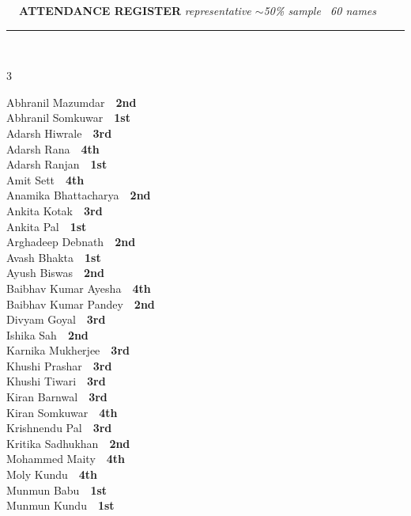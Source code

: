 \documentclass[11pt,a4paper]{article}
\begin{document}
\vspace{3pt}\noindent
{\footnotesize\bfseries\color{Slate}\faListOl~~ATTENDANCE REGISTER}%
\hfill{\scriptsize\itshape\color{Slate}representative $\sim$50\% sample \textperiodcentered\ 60 names}\\[3pt]
{\color{Line}\rule{\linewidth}{0.5pt}}\\[5pt]
\begingroup\footnotesize\setlength{\columnsep}{20pt}\setlength{\parskip}{1pt}%
\begin{multicols}{3}\raggedright
Abhranil Mazumdar~\dotfill~\textbf{2nd}\\
Abhranil Somkuwar~\dotfill~\textbf{1st}\\
Adarsh Hiwrale~\dotfill~\textbf{3rd}\\
Adarsh Rana~\dotfill~\textbf{4th}\\
Adarsh Ranjan~\dotfill~\textbf{1st}\\
Amit Sett~\dotfill~\textbf{4th}\\
Anamika Bhattacharya~\dotfill~\textbf{2nd}\\
Ankita Kotak~\dotfill~\textbf{3rd}\\
Ankita Pal~\dotfill~\textbf{1st}\\
Arghadeep Debnath~\dotfill~\textbf{2nd}\\
Avash Bhakta~\dotfill~\textbf{1st}\\
Ayush Biswas~\dotfill~\textbf{2nd}\\
Baibhav Kumar Ayesha~\dotfill~\textbf{4th}\\
Baibhav Kumar Pandey~\dotfill~\textbf{2nd}\\
Divyam Goyal~\dotfill~\textbf{3rd}\\
Ishika Sah~\dotfill~\textbf{2nd}\\
Karnika Mukherjee~\dotfill~\textbf{3rd}\\
Khushi Prashar~\dotfill~\textbf{3rd}\\
Khushi Tiwari~\dotfill~\textbf{3rd}\\
Kiran Barnwal~\dotfill~\textbf{3rd}\\
Kiran Somkuwar~\dotfill~\textbf{4th}\\
Krishnendu Pal~\dotfill~\textbf{3rd}\\
Kritika Sadhukhan~\dotfill~\textbf{2nd}\\
Mohammed Maity~\dotfill~\textbf{4th}\\
Moly Kundu~\dotfill~\textbf{4th}\\
Munmun Babu~\dotfill~\textbf{1st}\\
Munmun Kundu~\dotfill~\textbf{1st}\\

\end{multicols}
\end{document}
